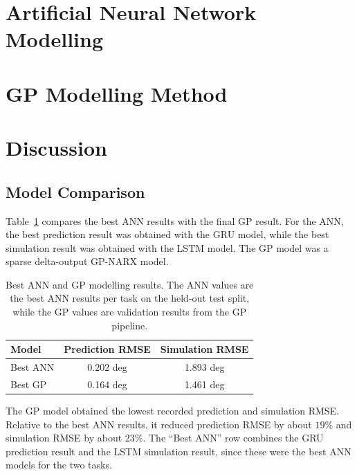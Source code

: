 \documentclass[conference]{IEEEtran}
\begin{document}
\section{Artificial Neural Network Modelling}


\section{GP Modelling Method}








\section{Discussion}

\subsection{Model Comparison}

Table~\ref{tab:ann_gp_comparison} compares the best ANN results with the final GP result.
For the ANN, the best prediction result was obtained with the GRU model, while the best simulation result was obtained with the LSTM model.
The GP model was a sparse delta-output GP-NARX model.

\begin{table}[htbp]
\caption{Best ANN and GP modelling results. The ANN values are the best ANN results per task on the held-out test split, while the GP values are validation results from the GP pipeline.}
\centering
\begin{tabular}{lcc}
\toprule
Model & Prediction RMSE & Simulation RMSE \\
\midrule
Best ANN & 0.202 deg & 1.893 deg \\
Best GP & 0.164 deg & 1.461 deg \\
\bottomrule
\end{tabular}
\label{tab:ann_gp_comparison}
\end{table}

The GP model obtained the lowest recorded prediction and simulation RMSE.
Relative to the best ANN results, it reduced prediction RMSE by about
\(19\%\) and simulation RMSE by about \(23\%\). The ``Best ANN'' row combines
the GRU prediction result and the LSTM simulation result, since these were the
best ANN models for the two tasks.
\end{document}
